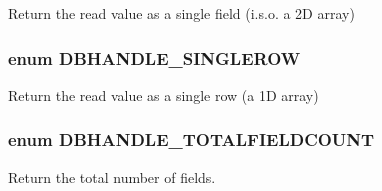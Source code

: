 Return the read value as a single field (i.s.o. a 2D array) 

\subsubsection[{DBHANDLE\_\-SINGLEROW}]{\setlength{\rightskip}{0pt plus 5cm}enum {\bf DBHANDLE\_\-SINGLEROW}}\label{group__DBHANDLE__ReturnFlags_ga5c8464b7bfbb63bd605046e8b615dbbe}


Return the read value as a single row (a 1D array) 

\subsubsection[{DBHANDLE\_\-TOTALFIELDCOUNT}]{\setlength{\rightskip}{0pt plus 5cm}enum {\bf DBHANDLE\_\-TOTALFIELDCOUNT}}\label{group__DBHANDLE__ReturnFlags_gaa74936d65eaded5fe8d34047a73e4cea}


Return the total number of fields. 

